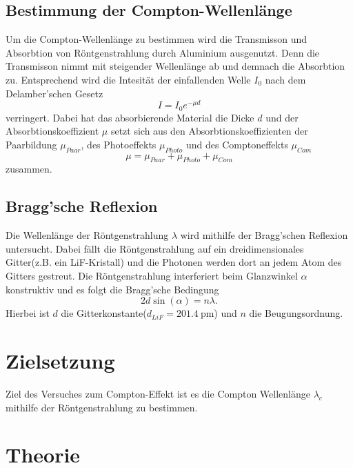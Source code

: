 \subsection{Bestimmung der Compton-Wellenlänge}
Um die Compton-Wellenlänge zu bestimmen wird die Transmisson und Absorbtion von Röntgenstrahlung durch Aluminium ausgenutzt.
Denn die Transmisson nimmt mit steigender Wellenlänge ab und demnach die Absorbtion zu. Entsprechend wird die Intesität der
einfallenden Welle $I_0$ nach dem Delamber'schen Gesetz
\begin{equation}
    I = I_0 e^{-\mu d}
\end{equation}
verringert. Dabei hat das absorbierende Material die Dicke $d$ und der Absorbtionskoeffizient $\mu$ setzt sich aus den Absorbtionskoeffizienten
der Paarbildung $\mu_{Paar}$, des Photoeffekts $\mu_{Photo}$ und des Comptoneffekts $\mu_{Com}$
\begin{equation*}
    \mu = \mu_{Paar} + \mu_{Photo} + \mu_{Com}
\end{equation*}
zusammen.
\subsection{Bragg'sche Reflexion}
Die Wellenlänge der Röntgenstrahlung $\lambda$ wird mithilfe der Bragg'schen Reflexion untersucht. Dabei fällt die Röntgenstrahlung auf ein dreidimensionales
Gitter(z.B. ein LiF-Kristall) und die Photonen werden dort an jedem Atom des Gitters gestreut. Die Röntgenstrahlung interferiert beim Glanzwinkel $\alpha$ konstruktiv
und es folgt die Bragg'sche Bedingung
\begin{equation}
    \label{eqn:Bragg}
    2d\sin\left(\alpha\right) = n\lambda.
\end{equation}
Hierbei ist $d$ die Gitterkonstante($d_{LiF} = \SI{201,4}{\pico\meter}$) und $n$ die Beugungsordnung.\cite{sample}\section{Zielsetzung}
\label{sec:Zielsetzung}
Ziel des Versuches zum Compton-Effekt ist es die Compton Wellenlänge $\lambda_c$ mithilfe der Röntgenstrahlung zu bestimmen.
\section{Theorie}
\label{sec:Theorie}
